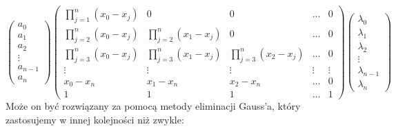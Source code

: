 \documentclass[11pt, wide]{article}
\begin{document}
\begin{equation}
    \left(\begin{array}{c}
        a_0\\
        a_1\\
        a_2\\
        \vdots\\
        a_{n-1}\\
        a_n
    \end{array}\right)
    \left(\begin{array}{ccccc}
        \prod_{j=1}^{n}(x_0 - x_j) & 0 & 0 & \ldots & 0\\
        \prod_{j=2}^{n}(x_0 - x_j) & \prod_{j=2}^{n}(x_1 - x_j) & 0 & \ldots & 0\\
        \prod_{j=3}^{n}(x_0 - x_j) & \prod_{j=3}^{n}(x_1 - x_j) & \prod_{j=3}^{n}(x_2 - x_j) & \ldots & 0\\
        \vdots & \vdots & \vdots & \vdots & \vdots\\
        x_0 - x_n & x_1 - x_n & x_2 - x_n & \ldots & 0\\
        1 & 1 & 1 & \ldots & 1
    \end{array}\right)
    \left(\begin{array}{c}
        \lambda_0\\
        \lambda_1\\
        \lambda_2\\
        \vdots\\
        \lambda_{n-1}\\
        \lambda_n
    \end{array}\right)
\end{equation} 
Może on być rozwiązany za pomocą metody eliminacji Gauss'a, który zastosujemy w 
innej kolejności niż zwykle:
\end{document}
